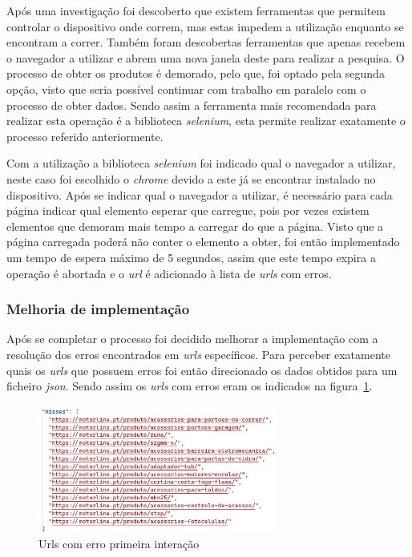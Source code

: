Após uma investigação foi descoberto que existem ferramentas que permitem controlar o dispositivo onde correm, mas estas impedem a utilização enquanto se encontram a correr. Também foram descobertas ferramentas que apenas recebem o navegador a utilizar e abrem uma nova janela deste para realizar a pesquisa.
O processo de obter os produtos é demorado, pelo que, foi optado pela segunda opção, visto que seria possível continuar com trabalho em paralelo com o processo de obter dados. Sendo assim a ferramenta mais recomendada para realizar esta operação é a biblioteca \textit{selenium}, esta  permite realizar exatamente o processo referido anteriormente.

Com a utilização a biblioteca \textit{selenium} foi indicado qual o navegador a utilizar, neste caso foi escolhido o \textit{chrome} devido a este já se encontrar instalado no dispositivo. Após se indicar qual o navegador a utilizar, é necessário para cada página indicar qual elemento esperar que carregue, pois por vezes existem elementos que demoram mais tempo a carregar do que a página. Visto que a página carregada poderá não conter o elemento a obter, foi então implementado um tempo de espera máximo de 5 segundos, assim que este tempo expira a operação é abortada e o \textit{url} é adicionado à lista de \textit{urls} com erros.

\newpage


\subsubsection{Melhoria de implementação}

Após se completar o processo foi decidido melhorar a implementação com a resolução dos erros encontrados em \textit{urls} específicos. Para perceber exatamente quais os \textit{urls}
que possuem erros foi então direcionado os dados obtidos para um ficheiro \textit{json}. Sendo assim os \textit{urls} com erros eram os indicados na figura~\ref{fig:57}.

\begin{figure}[htb]
    \centering
    
    \includegraphics[width=0.7\textwidth]{images/implementacao/scraper/urls_erro_iteracao_1.png}
    \caption{Urls com erro primeira interação}
    \label{fig:57}
\end{figure}

